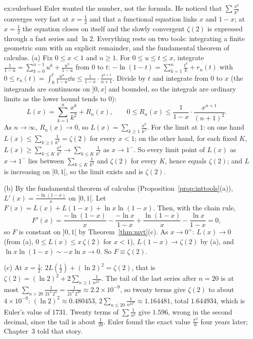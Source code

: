\begin{solution}{ex:eulerbasel}
\idea Euler wanted the number, not the formula. He noticed that $\sum\frac{x^k}{k^2}$ converges very fast at $x=\frac12$ and that a functional equation links $x$ and $1-x$; at $x=\frac12$ the equation closes on itself and the slowly convergent $\zeta(2)$ is expressed through a fast series and $\ln2$. Everything rests on two tools: integrating a finite geometric sum with an explicit remainder, and the fundamental theorem of calculus.
\writeup (a) Fix $0\le x<1$ and $n\ge1$. For $0\le u\le t\le x$, integrate $\frac1{1-u}=\sum_{k=0}^{n-1}u^k+\frac{u^n}{1-u}$ from $0$ to $t$:
$-\ln(1-t)=\sum_{k=1}^n\frac{t^k}k+r_n(t)$ with $0\le r_n(t)=\int_0^t\frac{u^n}{1-u}\dd u\le\frac1{1-x}\cdot\frac{t^{n+1}}{n+1}$.
Divide by $t$ and integrate from $0$ to $x$ (the integrands are continuous on $]0,x]$ and bounded, so the integrals are ordinary limits as the lower bound tends to $0$):
\[
L(x)=\sum_{k=1}^n\frac{x^k}{k^2}+R_n(x),\qquad0\le R_n(x)\le\frac1{1-x}\cdot\frac{x^{n+1}}{(n+1)^2}.
\]
As $n\to\infty$, $R_n(x)\to0$, so $L(x)=\sum_{k\ge1}\frac{x^k}{k^2}$. For the limit at $1$: on one hand $L(x)\le\sum_{k\ge1}\frac1{k^2}=\zeta(2)$ for every $x<1$; on the other hand, for each fixed $K$, $L(x)\ge\sum_{k\le K}\frac{x^k}{k^2}\to\sum_{k\le K}\frac1{k^2}$ as $x\to1^-$. So every limit point of $L(x)$ as $x\to1^-$ lies between $\sum_{k\le K}\frac1{k^2}$ and $\zeta(2)$ for every $K$, hence equals $\zeta(2)$; and $L$ is increasing on $[0,1[$, so the limit exists and is $\zeta(2)$.

(b) By the fundamental theorem of calculus (Proposition~\ref{prop:inttools}(a)), $L'(x)=\frac{-\ln(1-x)}x$ on $]0,1[$. Let $F(x)=L(x)+L(1-x)+\ln x\ln(1-x)$. Then, with the chain rule,
\[
F'(x)=\frac{-\ln(1-x)}x-\frac{-\ln x}{1-x}+\frac{\ln(1-x)}x-\frac{\ln x}{1-x}=0,
\]
so $F$ is constant on $]0,1[$ by Theorem~\ref{thm:mvt}(c). As $x\to0^+$: $L(x)\to0$ (from (a), $0\le L(x)\le x\,\zeta(2)$ for $x<1$), $L(1-x)\to\zeta(2)$ by (a), and $\ln x\ln(1-x)\sim-x\ln x\to0$. So $F\equiv\zeta(2)$.

(c) At $x=\frac12$: $2L\left(\frac12\right)+(\ln2)^2=\zeta(2)$, that is $\zeta(2)=(\ln2)^2+2\sum_{n\ge1}\frac1{n^22^n}$. The tail of the last series after $n=20$ is at most $\sum_{n>20}\frac1{21^2\,2^n}=\frac1{21^2\,2^{20}}\approx2.2\times10^{-9}$, so twenty terms give $\zeta(2)$ to about $4\times10^{-9}$: $(\ln2)^2\approx0.480453$, $2\sum_{n\le20}\frac1{n^22^n}\approx1.164481$, total $1.644934$, which is Euler's value of 1731. Twenty terms of $\sum\frac1{n^2}$ give $1.596$, wrong in the second decimal, since the tail is about $\frac1{20}$. Euler found the exact value $\frac{\pi^2}6$ four years later; Chapter~3 told that story.
\end{solution}

